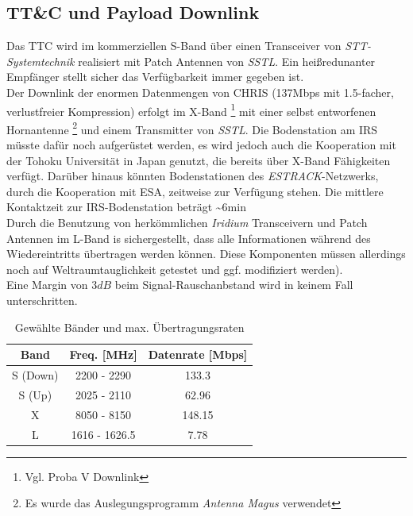 \documentclass[twoside]{article}
\begin{document}
\begin{multicols}{2}
      \subsection{TT\&C und Payload Downlink}
      Das TTC wird im kommerziellen S-Band über einen Transceiver von
      \textit{STT-Systemtechnik} realisiert mit Patch Antennen von \textit{SSTL}.
      Ein heißredunanter Empfänger stellt sicher das Verfügbarkeit immer gegeben ist.\\
      Der Downlink der enormen Datenmengen von CHRIS (137Mbps mit 1.5-facher,
      verlustfreier Kompression) erfolgt im X-Band \footnote{Vgl. Proba V
      Downlink} mit einer selbst entworfenen Hornantenne \footnote{Es
         wurde das Auslegungsprogramm \textit{Antenna Magus} verwendet}
         und einem Transmitter von \textit{SSTL}. Die Bodenstation am IRS müsste
         dafür noch aufgerüstet werden, es wird jedoch auch die Kooperation mit
         der Tohoku Universität in Japan genutzt, die bereits über X-Band Fähigkeiten
         verfügt. Darüber hinaus könnten Bodenstationen des \textit{ESTRACK}-Netzwerks,
         durch die Kooperation mit ESA, zeitweise zur Verfügung stehen.
         Die mittlere Kontaktzeit zur IRS-Bodenstation beträgt \textasciitilde 6min\\
         Durch die Benutzung von herkömmlichen \textit{Iridium} Transceivern und Patch 
         Antennen im L-Band is sichergestellt, dass alle Informationen während des
         Wiedereintritts übertragen werden können. Diese Komponenten müssen 
         allerdings noch auf Weltraumtauglichkeit getestet und ggf. modifiziert werden).\\
         Eine Margin von $3dB$ beim Signal-Rauschanbstand wird in keinem Fall unterschritten.
         \begin{table}[H]
            \centering
            \begin{tabular}{ccc}
               \toprule  
               Band & Freq. [MHz] & Datenrate [Mbps]\\
               \midrule
               S (Down) & 2200 - 2290 & 133.3 \\
               S (Up) & 2025 - 2110 & 62.96 \\
               X & 8050 - 8150 & 148.15 \\
               L & 1616 - 1626.5 & 7.78 \\
               \bottomrule
            \end{tabular}
            \caption{Gewählte Bänder und max. Übertragungsraten}
            \label{tab:ttcconfig}

\end{table}
\end{multicols}
\end{document}
